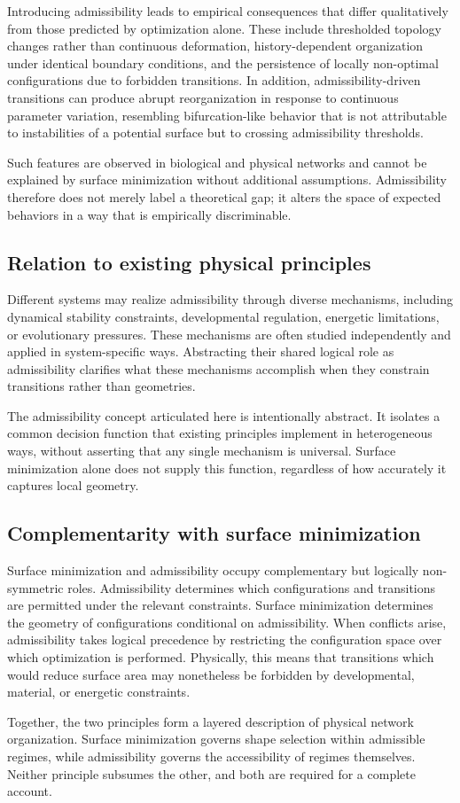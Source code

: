 Introducing admissibility leads to empirical consequences that differ qualitatively from those predicted by optimization alone. These include thresholded topology changes rather than continuous deformation, history-dependent organization under identical boundary conditions, and the persistence of locally non-optimal configurations due to forbidden transitions. In addition, admissibility-driven transitions can produce abrupt reorganization in response to continuous parameter variation, resembling bifurcation-like behavior that is not attributable to instabilities of a potential surface but to crossing admissibility thresholds.

Such features are observed in biological and physical networks and cannot be explained by surface minimization without additional assumptions. Admissibility therefore does not merely label a theoretical gap; it alters the space of expected behaviors in a way that is empirically discriminable.

\subsection{Relation to existing physical principles}

Different systems may realize admissibility through diverse mechanisms, including dynamical stability constraints, developmental regulation, energetic limitations, or evolutionary pressures. These mechanisms are often studied independently and applied in system-specific ways. Abstracting their shared logical role as admissibility clarifies what these mechanisms accomplish when they constrain transitions rather than geometries.

The admissibility concept articulated here is intentionally abstract. It isolates a common decision function that existing principles implement in heterogeneous ways, without asserting that any single mechanism is universal. Surface minimization alone does not supply this function, regardless of how accurately it captures local geometry.

\subsection{Complementarity with surface minimization}

Surface minimization and admissibility occupy complementary but logically non-symmetric roles. Admissibility determines which configurations and transitions are permitted under the relevant constraints. Surface minimization determines the geometry of configurations conditional on admissibility. When conflicts arise, admissibility takes logical precedence by restricting the configuration space over which optimization is performed. Physically, this means that transitions which would reduce surface area may nonetheless be forbidden by developmental, material, or energetic constraints.

Together, the two principles form a layered description of physical network organization. Surface minimization governs shape selection within admissible regimes, while admissibility governs the accessibility of regimes themselves. Neither principle subsumes the other, and both are required for a complete account.
